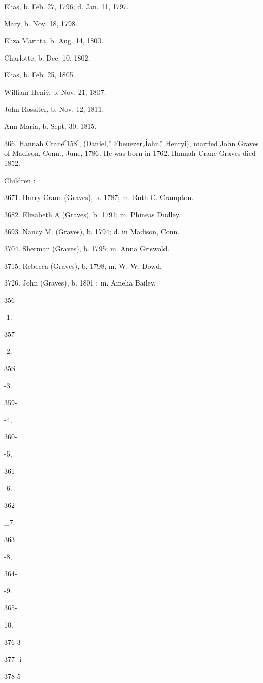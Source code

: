 \documentclass{book}
\begin{document}
Elias, b. Feb. 27, 1796; d. Jan. 11, 1797. 

Mary, b. Nov. 18, 1798. 

Eliza Maritta, b. Aug. 14, 1800. 

Charlotte, b. Dec. 10, 1802. 

Elias, b. Feb. 25, 1805. 

William Heni\^y, b. Nov. 21, 1807. 

John Rossiter, b. Nov. 12, 1811. 

Ann Maria, b. Sept. 30, 1815. 

366. Hannah Crane\^ [158], (Daniel,'' Ebeuezer,\^ John,\^ ' 
Henryi), married John Graves of Madison, Conn., June, 1786. 
He was born in 1762. Hannah Crane Graves died 1852. 

Children : 

3671. Harry Crane (Graves), b. 1787; m. Ruth C. Crampton. 

3682. Elizabeth A (Graves), b. 1791; m. Phineas Dudley. 

3693. Nancy M. (Graves), b. 1794; d. in Madison, Conn. 

3704. Sherman (Graves), b. 1795; m. Anna Griswold. 

3715. Rebecca (Graves), b. 1798; m. W. W. Dowd. 

3726. John (Graves), b. 1801 ; m. Amelia Bailey. 



356- 


-1. 


357- 


-2. 


35S- 


-3. 


359- 


-4, 


360- 


-5, 


361- 


-6. 


362- 


\_7. 


363- 


-8, 


364- 


-9. 


365- 


10. 



376 3 

377 -i 

378 5 
\end{document}
